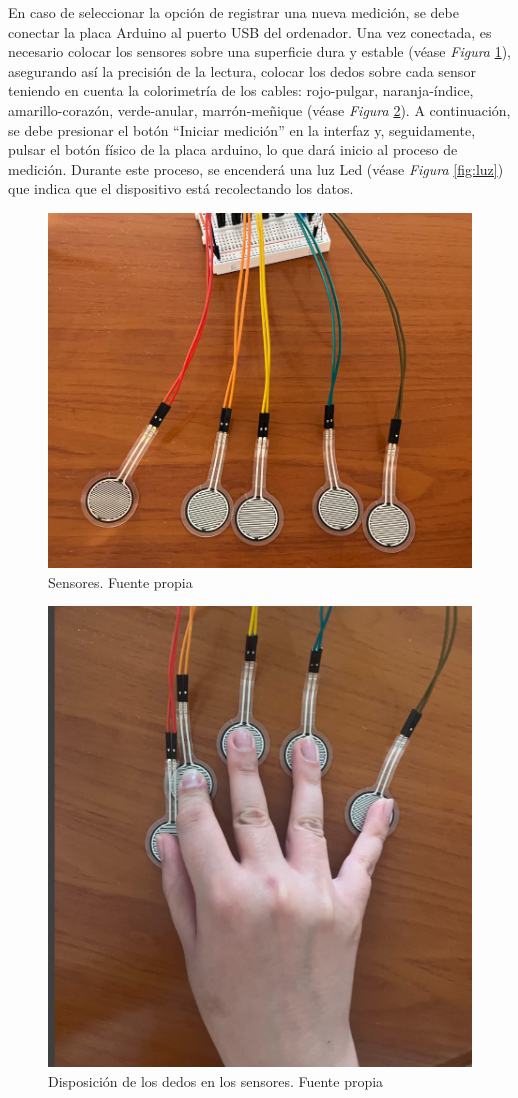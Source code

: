 En caso de seleccionar la opción de registrar una nueva medición, se debe conectar la placa Arduino al puerto USB del ordenador. Una vez conectada, es necesario colocar los sensores sobre una superficie dura y estable (véase \textit{Figura} \ref{fig:sensores_mesa}), asegurando así la precisión de la lectura, colocar los dedos sobre cada sensor teniendo en cuenta la colorimetría de los cables: rojo-pulgar, naranja-índice, amarillo-corazón, verde-anular, marrón-meñique (véase \textit{Figura} \ref{fig:sensor_mano}). A continuación, se debe presionar el botón “Iniciar medición” en la interfaz y, seguidamente, pulsar el botón físico de la placa arduino, lo que dará inicio al proceso de medición. Durante este proceso, se encenderá una luz Led (véase \textit{Figura} \ref{fig:luz}) que indica que el dispositivo está recolectando los datos.
\begin{figure}
    \centering
    \includegraphics[width=0.5\linewidth]{img/Sensores.png}
    \caption{Sensores. Fuente propia}
    \label{fig:sensores_mesa}
\end{figure}
\begin{figure}
    \centering
    \includegraphics[width=0.5\linewidth]{img/sensor_mano.png}
    \caption{Disposición de los dedos en los sensores. Fuente propia}
    \label{fig:sensor_mano}
\end{figure}
